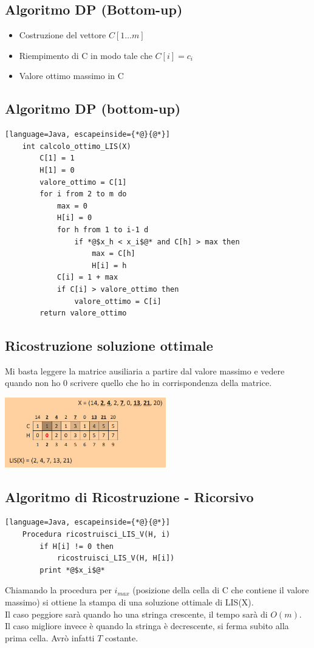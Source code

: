 \subsection{Algoritmo DP (Bottom-up)}
\begin{itemize}
    \item Costruzione del vettore $C[1\dots m]$
    \item Riempimento di C in modo tale che $C[i]=c_i$
    \item Valore ottimo \ra massimo in C
\end{itemize}
\subsection{Algoritmo DP (bottom-up)}
\begin{lstlisting}[language=Java, escapeinside={*@}{@*}]
    int calcolo_ottimo_LIS(X)
        C[1] = 1
        H[1] = 0
        valore_ottimo = C[1]
        for i from 2 to m do
            max = 0
            H[i] = 0
            for h from 1 to i-1 d
                if *@$x_h < x_i$@* and C[h] > max then
                    max = C[h]
                    H[i] = h
            C[i] = 1 + max
            if C[i] > valore_ottimo then
                valore_ottimo = C[i]
        return valore_ottimo
\end{lstlisting}
\subsection{Ricostruzione soluzione ottimale}
Mi basta leggere la matrice ausiliaria a partire dal valore massimo e vedere quando non ho 0 scrivere quello che ho in
corrispondenza della matrice.
\begin{center}
    \includegraphics[width=70mm,scale=0.5]{chapters_ulerich/img/LIS_ricostruzione_sol_ott.png}
\end{center}
\subsection{Algoritmo di Ricostruzione - Ricorsivo}
\begin{lstlisting}[language=Java, escapeinside={*@}{@*}]
    Procedura ricostruisci_LIS_V(H, i)
        if H[i] != 0 then
            ricostruisci_LIS_V(H, H[i])
        print *@$x_i$@*
\end{lstlisting}
Chiamando la procedura per $i_{max}$ (posizione della cella
di C che contiene il valore massimo) si ottiene la
stampa di una soluzione ottimale di LIS(X).\\
Il caso peggiore sarà quando ho una stringa crescente, il tempo sarà di $O(m)$.\\
Il caso migliore invece è quando la stringa è decrescente, si ferma subito alla prima cella.
Avrò infatti $T$ costante.

        


